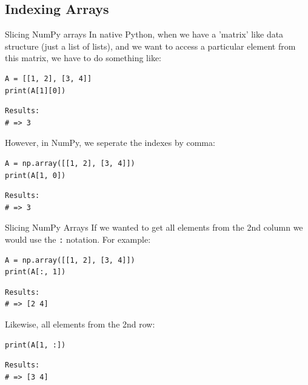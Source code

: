 \documentclass[10pt]{beamer}
\begin{document}
\subsection{Indexing Arrays}
\label{sec:org9211437}

\begin{frame}[label={sec:org603b39d},fragile]{Slicing NumPy arrays}
 In native Python, when we have a 'matrix' like data structure (just a list of lists),
and we want to access a particular element from this matrix, we have to do something
like:

\begin{verbatim}
A = [[1, 2], [3, 4]]
print(A[1][0])
\end{verbatim}

\begin{verbatim}
Results: 
# => 3
\end{verbatim}


However, in NumPy, we seperate the indexes by comma:

\begin{verbatim}
A = np.array([[1, 2], [3, 4]])
print(A[1, 0])
\end{verbatim}

\begin{verbatim}
Results: 
# => 3
\end{verbatim}
\end{frame}

\begin{frame}[label={sec:org78da73f},fragile]{Slicing NumPy Arrays}
 If we wanted to get all elements from the 2nd column we would use the \texttt{:} notation. For
example:

\begin{verbatim}
A = np.array([[1, 2], [3, 4]])
print(A[:, 1])
\end{verbatim}

\begin{verbatim}
Results: 
# => [2 4]
\end{verbatim}


Likewise, all elements from the 2nd row:

\begin{verbatim}
print(A[1, :])
\end{verbatim}

\begin{verbatim}
Results: 
# => [3 4]
\end{verbatim}
\end{frame}
\end{document}
